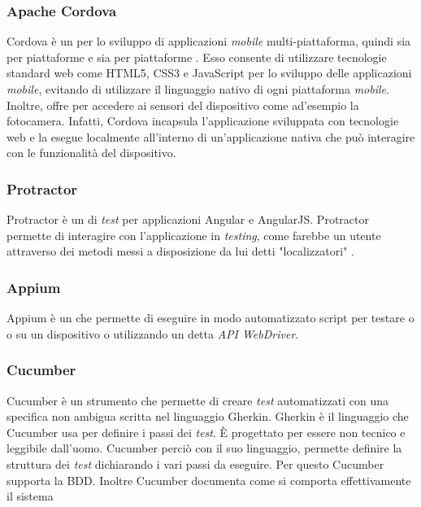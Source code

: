 \subsubsection*{Apache Cordova}
Cordova è un   per lo sviluppo di applicazioni \emph{mobile} multi-piattaforma, quindi sia per piattaforme  e sia per piattaforme . Esso consente di utilizzare tecnologie standard web come \gls{HTML}5, \gls{CSS}3 e JavaScript per lo sviluppo delle applicazioni \emph{mobile}, evitando di utilizzare il linguaggio nativo di ogni piattaforma \emph{mobile}. Inoltre, offre  per accedere ai sensori del dispositivo come ad'esempio la fotocamera. Infatti, Cordova incapsula l'applicazione sviluppata con tecnologie web e la esegue localmente all’interno di un’applicazione nativa che può interagire con le funzionalità del dispositivo.

\subsubsection*{Protractor}
Protractor è un  di \emph{test}  per applicazioni Angular e AngularJS. Protractor permette di interagire con l'applicazione in \emph{testing}, come farebbe un utente attraverso dei metodi messi a disposizione da lui detti "localizzatori" .

\subsubsection*{Appium}
Appium è un   che permette di eseguire in modo automatizzato script per testare \textcolor{SchoolColor}{\ap{[g]}} o \textcolor{SchoolColor}{\ap{[g]}} o \textcolor{SchoolColor}{\ap{[g]}} su un dispositivo  o  utilizzando un  detta \emph{API WebDriver}.

\subsubsection*{Cucumber}
Cucumber è un strumento che permette di creare \emph{test} automatizzati con una specifica non ambigua scritta nel linguaggio Gherkin. Gherkin è il linguaggio che Cucumber usa per definire i passi dei \emph{test}. È progettato per essere non tecnico e leggibile dall'uomo. Cucumber perciò con il suo linguaggio, permette definire la struttura dei \emph{test} dichiarando i vari passi da eseguire. Per questo Cucumber supporta la \gls{BDD}. Inoltre Cucumber documenta come si comporta effettivamente il sistema

